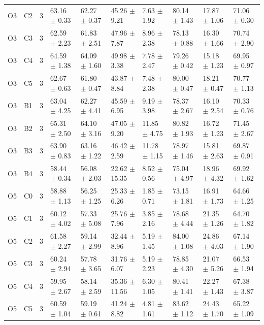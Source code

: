 \begin{table}[t]
\begin{tabular}{llllllllll}
O3 & C2 & 3 & 63.16 $\pm$ 0.33 & 62.27 $\pm$ 0.37 & 45.26 $\pm$ 9.21 & 7.63 $\pm$ 1.92 & 80.14 $\pm$ 1.43 & 17.87 $\pm$ 1.06 & 71.06 $\pm$ 0.30 \\
O3 & C3 & 3 & 62.59 $\pm$ 2.23 & 61.83 $\pm$ 2.51 & 47.96 $\pm$ 7.87 & 8.96 $\pm$ 2.38 & 78.13 $\pm$ 0.88 & 16.30 $\pm$ 1.66 & 70.74 $\pm$ 2.90 \\
O3 & C4 & 3 & 64.59 $\pm$ 1.38 & 64.09 $\pm$ 1.60 & 49.98 $\pm$ 3.38 & 7.78 $\pm$ 2.47 & 79.26 $\pm$ 0.42 & 15.18 $\pm$ 1.23 & 69.95 $\pm$ 0.97 \\
O3 & C5 & 3 & 62.67 $\pm$ 0.63 & 61.80 $\pm$ 0.47 & 43.87 $\pm$ 8.84 & 7.48 $\pm$ 2.38 & 80.00 $\pm$ 0.47 & 18.21 $\pm$ 0.47 & 70.77 $\pm$ 1.13 \\
O3 & B1 & 3 & 63.04 $\pm$ 4.25 & 62.27 $\pm$ 4.41 & 45.59 $\pm$ 6.95 & 9.19 $\pm$ 3.98 & 78.37 $\pm$ 2.67 & 16.10 $\pm$ 2.54 & 70.33 $\pm$ 0.76 \\
O3 & B2 & 3 & 65.31 $\pm$ 2.50 & 64.10 $\pm$ 3.16 & 47.05 $\pm$ 9.20 & 11.85 $\pm$ 4.75 & 80.82 $\pm$ 1.93 & 16.72 $\pm$ 1.23 & 71.45 $\pm$ 2.67 \\
O3 & B3 & 3 & 63.90 $\pm$ 0.83 & 63.16 $\pm$ 1.22 & 46.42 $\pm$ 2.59 & 11.78 $\pm$ 1.15 & 78.97 $\pm$ 1.46 & 15.81 $\pm$ 2.63 & 69.87 $\pm$ 0.91 \\
O3 & B4 & 3 & 58.44 $\pm$ 0.34 & 56.08 $\pm$ 2.03 & 22.62 $\pm$ 15.35 & 8.52 $\pm$ 0.56 & 75.04 $\pm$ 4.97 & 18.96 $\pm$ 4.32 & 69.92 $\pm$ 1.62 \\
O5 & C0 & 3 & 58.88 $\pm$ 1.13 & 56.25 $\pm$ 1.25 & 25.33 $\pm$ 6.26 & 1.85 $\pm$ 0.71 & 73.15 $\pm$ 1.81 & 16.91 $\pm$ 1.73 & 64.66 $\pm$ 1.25 \\
O5 & C1 & 3 & 60.12 $\pm$ 4.02 & 57.33 $\pm$ 5.08 & 25.76 $\pm$ 7.96 & 3.85 $\pm$ 2.16 & 78.68 $\pm$ 4.44 & 21.35 $\pm$ 1.26 & 64.70 $\pm$ 1.82 \\
O5 & C2 & 3 & 61.58 $\pm$ 2.27 & 59.14 $\pm$ 2.99 & 32.44 $\pm$ 8.96 & 5.19 $\pm$ 1.45 & 84.00 $\pm$ 1.08 & 24.86 $\pm$ 4.03 & 67.14 $\pm$ 1.90 \\
O5 & C3 & 3 & 60.24 $\pm$ 2.94 & 57.78 $\pm$ 3.65 & 31.76 $\pm$ 6.07 & 5.19 $\pm$ 2.23 & 78.85 $\pm$ 4.30 & 21.07 $\pm$ 5.26 & 66.53 $\pm$ 1.94 \\
O5 & C4 & 3 & 59.95 $\pm$ 2.67 & 58.14 $\pm$ 2.59 & 35.36 $\pm$ 11.56 & 6.30 $\pm$ 1.05 & 80.41 $\pm$ 1.41 & 22.27 $\pm$ 1.43 & 67.38 $\pm$ 3.87 \\
O5 & C5 & 3 & 60.59 $\pm$ 1.04 & 59.19 $\pm$ 0.61 & 41.24 $\pm$ 8.82 & 4.81 $\pm$ 1.61 & 83.62 $\pm$ 1.12 & 24.43 $\pm$ 1.70 & 65.22 $\pm$ 1.09 \\

\end{tabular}
\end{table}
